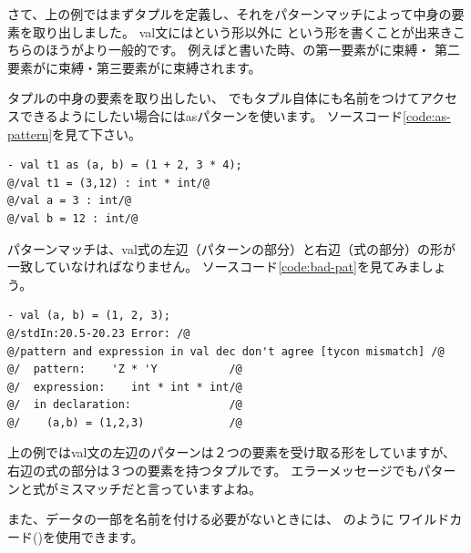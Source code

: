 \documentclass[11pt,a4paper]{article}
\begin{document}
さて、上の例ではまずタプルを定義し、それをパターンマッチによって中身の要素を取り出しました。
val文にはという形以外に
という形を書くことが出来きこちらのほうがより一般的です。
例えばと書いた時、の第一要素がに束縛・
第二要素がに束縛・第三要素がに束縛されます。

タプルの中身の要素を取り出したい、
でもタプル自体にも名前をつけてアクセスできるようにしたい場合にはasパターンを使います。
ソースコード\ref{code:as-pattern}を見て下さい。

\begin{lstlisting}[caption=asパターン,label=code:as-pattern]
- val t1 as (a, b) = (1 + 2, 3 * 4);
@/val t1 = (3,12) : int * int/@
@/val a = 3 : int/@
@/val b = 12 : int/@
\end{lstlisting}

パターンマッチは、val式の左辺（パターンの部分）と右辺（式の部分）の形が一致していなければなりません。
ソースコード\ref{code:bad-pat}を見てみましょう。
\begin{lstlisting}[caption=型が合わないパターンマッチ,label=code:bad-pat]
- val (a, b) = (1, 2, 3);
@/stdIn:20.5-20.23 Error: /@
@/pattern and expression in val dec don't agree [tycon mismatch] /@
@/  pattern:    'Z * 'Y           /@
@/  expression:    int * int * int/@
@/  in declaration:               /@
@/    (a,b) = (1,2,3)             /@
\end{lstlisting}

上の例ではval文の左辺のパターンは２つの要素を受け取る形をしていますが、
右辺の式の部分は３つの要素を持つタプルです。
エラーメッセージでもパターンと式がミスマッチだと言っていますよね。

また、データの一部を名前を付ける必要がないときには、
のように
ワイルドカード(\prog{_})を使用できます。
\end{document}

